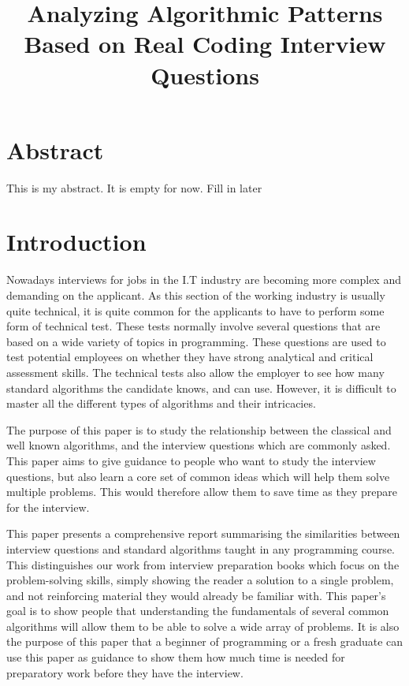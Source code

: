 \documentclass[10pt,twocolumn]{IEEEtran}
\title{Analyzing Algorithmic Patterns Based on Real Coding Interview Questions}
\author{\IEEEauthorblockN{Ian Dempsey,\\
Computer Science Department,\\
Maynooth University,\\
Email: ian.dempsey.2013@mumail.ie}
}
\begin{document}
\maketitle
{}
\newpage
{}
\section{Abstract}
This is my abstract. It is empty for now. Fill in later
\section{Introduction}
\label{sec:intro}
\par
Nowadays interviews for jobs in the I.T industry are becoming more complex and demanding on the applicant. As this section of the working industry is usually quite technical, it is quite common for the applicants to have to perform some form of technical test. These tests normally involve several questions that are based on a wide variety of topics in programming. These questions are used to test potential employees on whether they have strong analytical and critical assessment skills. The technical tests also allow the employer to see how many standard algorithms the candidate knows, and can use. However, it is difficult to master all the different types of algorithms and their intricacies. 
\par The purpose of this paper is to study the relationship between the classical and well known algorithms, and the interview questions which are commonly asked.  This paper aims to give guidance to people who want to study the interview questions, but also learn a core set of common ideas which will help them solve multiple problems. This would therefore allow them to save time as they prepare for the interview.
\par This paper presents a comprehensive report summarising the similarities between interview questions and standard algorithms taught in any programming course. This distinguishes our work from interview preparation books which focus on the problem-solving skills, simply showing the reader a solution to a single problem, and not reinforcing material they would already be familiar with. This paper's goal is to show people that understanding the fundamentals of several common algorithms will allow them to be able to solve a wide array of problems. It is also the purpose of this paper that a beginner of programming or a fresh graduate can use this paper as guidance to show them how much time is needed for preparatory work before they have the interview.  
\end{document}
